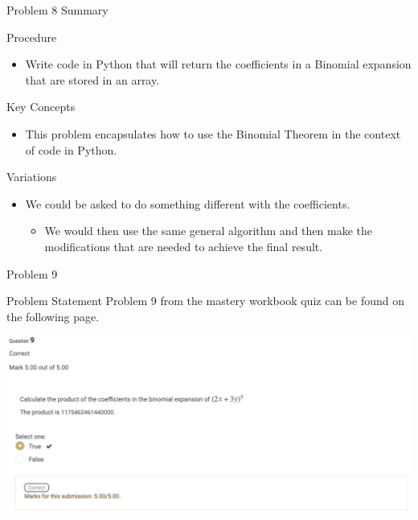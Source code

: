 \begin{summary}{Problem 8 Summary}
    \begin{statement}{Procedure}
        \begin{itemize}
            \item Write code in Python that will return the coefficients in a Binomial expansion that are stored in an array.
        \end{itemize}
    \end{statement}
    \begin{statement}{Key Concepts}
        \begin{itemize}
            \item This problem encapsulates how to use the Binomial Theorem in the context of code in Python.
        \end{itemize}
    \end{statement}
    \begin{statement}{Variations}
        \begin{itemize}
            \item We could be asked to do something different with the coefficients.
            \begin{itemize}
                \item We would then use the same general algorithm and then make the modifications that are needed to achieve the final result.
            \end{itemize}
        \end{itemize}
    \end{statement}
\end{summary}

\begin{problem}{Problem 9}
    \begin{statement}{Problem Statement}
        Problem 9 from the mastery workbook quiz can be found on the following page.
    \end{statement}
    \begin{Highlight}[Solution]
        \begin{center}
            \includegraphics[width = 1.0\textwidth]{Images/Problem 9.png}
        \end{center}
    \end{Highlight}
\end{problem}

